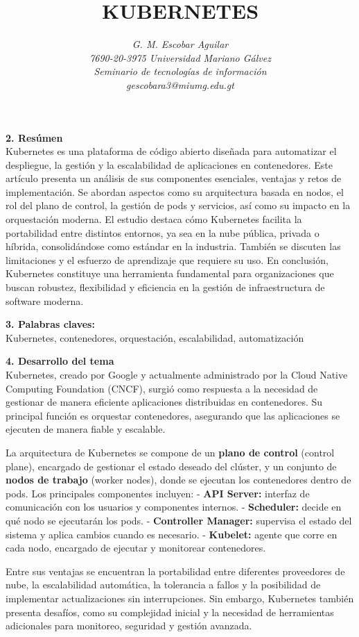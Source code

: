 \documentclass[12pt]{article}
\title{\textbf{\MakeUppercase{KUBERNETES}}}
\author{\textit{G. M. Escobar Aguilar}\\
\textit{7690-20-3975 Universidad Mariano Gálvez}\\
\textit{Seminario de tecnologías de información}\\
\textit{gescobara3@miumg.edu.gt}}
\date{}
\begin{document}
\maketitle

\textbf{2. Resúmen}  
\\
Kubernetes es una plataforma de código abierto diseñada para automatizar el despliegue, la gestión y la escalabilidad de aplicaciones en contenedores. Este artículo presenta un análisis de sus componentes esenciales, ventajas y retos de implementación. Se abordan aspectos como su arquitectura basada en nodos, el rol del plano de control, la gestión de pods y servicios, así como su impacto en la orquestación moderna. El estudio destaca cómo Kubernetes facilita la portabilidad entre distintos entornos, ya sea en la nube pública, privada o híbrida, consolidándose como estándar en la industria. También se discuten las limitaciones y el esfuerzo de aprendizaje que requiere su uso. En conclusión, Kubernetes constituye una herramienta fundamental para organizaciones que buscan robustez, flexibilidad y eficiencia en la gestión de infraestructura de software moderna.

\textbf{3. Palabras claves:}  
\\
Kubernetes, contenedores, orquestación, escalabilidad, automatización

\textbf{4. Desarrollo del tema}  
\\
Kubernetes, creado por Google y actualmente administrado por la Cloud Native Computing Foundation (CNCF), surgió como respuesta a la necesidad de gestionar de manera eficiente aplicaciones distribuidas en contenedores. Su principal función es orquestar contenedores, asegurando que las aplicaciones se ejecuten de manera fiable y escalable.  

La arquitectura de Kubernetes se compone de un \textbf{plano de control} (control plane), encargado de gestionar el estado deseado del clúster, y un conjunto de \textbf{nodos de trabajo} (worker nodes), donde se ejecutan los contenedores dentro de pods. Los principales componentes incluyen:  
- \textbf{API Server:} interfaz de comunicación con los usuarios y componentes internos.  
- \textbf{Scheduler:} decide en qué nodo se ejecutarán los pods.  
- \textbf{Controller Manager:} supervisa el estado del sistema y aplica cambios cuando es necesario.  
- \textbf{Kubelet:} agente que corre en cada nodo, encargado de ejecutar y monitorear contenedores.  

Entre sus ventajas se encuentran la portabilidad entre diferentes proveedores de nube, la escalabilidad automática, la tolerancia a fallos y la posibilidad de implementar actualizaciones sin interrupciones. Sin embargo, Kubernetes también presenta desafíos, como su complejidad inicial y la necesidad de herramientas adicionales para monitoreo, seguridad y gestión avanzada.
\end{document}
